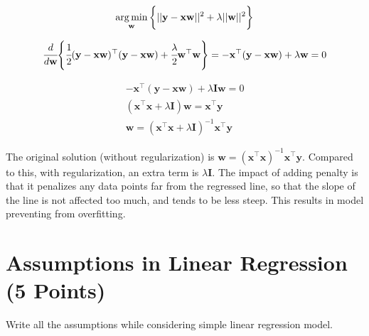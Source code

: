 \documentclass[12pt, xcolor=dvipsnames,svgnames,x11names]{article}
\begin{document}
\begin{answerbox}
$$
\operatorname*{arg\,min}_\textbf{w} \bigg\{ ||\textbf{y} - \textbf{x} \textbf{w}||^2  + \lambda||\textbf{w}||^2  \bigg\}
$$

$$
\cfrac{d}{d\textbf{w}}\Bigg\{   \cfrac{1}{2}(\textbf{y} - \textbf{x}\textbf{w})^\top(\textbf{y} - \textbf{x}\textbf{w})  + \cfrac{\lambda}{2}\textbf{w}^\top \textbf{w}\Bigg\} = - \textbf{x}^\top (\textbf{y} -\textbf{x}\textbf{w}) + \lambda \textbf{w} = 0
$$

\begin{align*}
- \textbf{x}^\top (\textbf{y} -\textbf{x}\textbf{w}) + \lambda \textbf{I}\textbf{w} = 0\\
(\textbf{x}^\top\textbf{x} + \lambda\textbf{I})\textbf{w} = \textbf{x}^\top \textbf{y}\\
\textbf{w} = (\textbf{x}^\top\textbf{x} + \lambda \textbf{I})^{-1} \textbf{x}^\top \textbf{y}
\end{align*}

The original solution (without regularization) is $\textbf{w} = (\textbf{x}^\top\textbf{x})^{-1} \textbf{x}^\top \textbf{y}$. Compared to this, with regularization, an extra term is $ \lambda \textbf{I}$. The impact of adding penalty is that it penalizes any data points far from the regressed line, so that the slope of the line is not affected too much, and tends to be less steep. This results in model preventing from overfitting.
\end{answerbox}


\section{Assumptions in Linear Regression (5 Points)}

Write all the assumptions while considering simple linear regression model.
\end{document}
